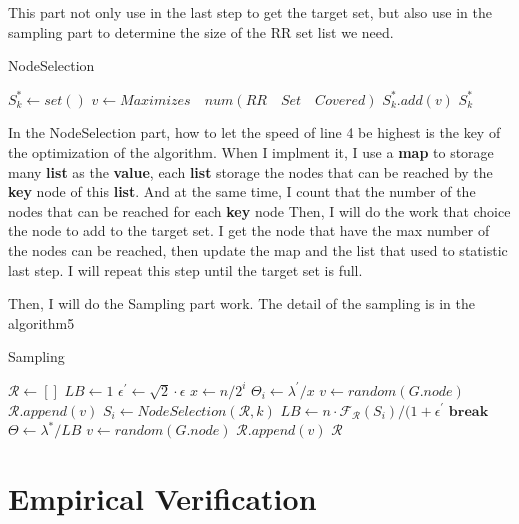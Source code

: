 \documentclass[conference,compsoc]{IEEEtran}
\begin{document}
      This part not only use in the last step to get the target set, but also use in the sampling part to determine the size of the RR set list we need.
      \begin{algorithm}
        \caption{NodeSelection}
        \begin{algorithmic}[1]
            \State $S_{k}^{*}\gets set()$
              \State $v\gets Maximizes\quad num(RR\quad Set\quad Covered)$
              \State $S_{k}^{*}.add(v)$
            \EndFor
          \EndFunction
          \State \Return $S_{k}^{*}$
        \end{algorithmic}
      \end{algorithm}
      In the NodeSelection part, how to let the speed of line 4 be highest is the key of the optimization of the algorithm.
      When I implment it, I use a \textbf{map} to storage many \textbf{list} as the \textbf{{value}}, each \textbf{list} storage the nodes that can be reached by the \textbf{key} node of this \textbf{list}.
      And at the same time, I count that the number of the nodes that can be reached for each \textbf{key} node
      Then, I will do the work that choice the node to add to the target set. I get the node that have the max number of the nodes can be reached, then update the map and the list that used to statistic last step.
      I will repeat this step until the target set is full.
      
      Then, I will do the Sampling part work. The detail of the sampling is in the algorithm5
      \begin{algorithm}
        \caption{Sampling}
        \begin{algorithmic}[1]
            \State $\mathcal{R}\gets []$
            \State $LB\gets 1$
            \State $\epsilon^{'} \gets \sqrt{2}\cdot\epsilon$
              \State $x\gets n/2^i$
              \State $\Theta_i \gets \lambda^{'}/x$
                \State $v\gets random(G.node)$
                \State $\mathcal{R}.append(v)$
              \EndWhile
              \State $S_i\gets NodeSelection(\mathcal{R},k)$
                \State $LB\gets n\cdot\mathcal{F_R}(S_i)/(1+\epsilon^{'}$
                \State $\textbf{break}$
              \EndIf
            \EndFor
            \State $\Theta\gets\lambda^{*}/LB$
              \State $v\gets random(G.node)$
              \State $\mathcal{R}.append(v)$
            \EndWhile
            \State \Return $\mathcal{R}$
          \EndFunction
        \end{algorithmic}
      \end{algorithm}

\section{Empirical Verification}



\end{document}
